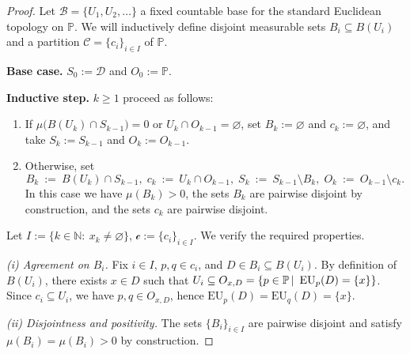 \documentclass[a4paper]{article}
\renewcommand\P{\mathbb{P}} %
\newcommand\EU{\mathrm{EU}}
\newcommand{\Decs}{\mathcal{D}}
\newcommand{\IP}{\P}
\newcommand\SetDelimiter[1][]{
	\nonscript\,#1\vert \allowbreak \nonscript\,\mathopen{}}
\providecommand\given{\SetDelimiter}
\renewcommand{\emptyset}{\varnothing}
\renewcommand{\geq}{\geqslant}
\newenvironment{CCM rewritten}
{\begingroup\color{blue}} %
{\endgroup}              %
\begin{document}
\begin{proof}
Let $\mathcal{B}=\{U_1,U_2,\dots\}$ a fixed countable base for the standard Euclidean topology on $\IP$. We will inductively define disjoint measurable sets $B_i\subseteq B(U_i)$ and a partition $\mathcal{C}=\{c_i\}_{i\in I}$ of $\IP$.

\textbf{Base case.} $S_0:=\Decs$ and $O_0:=\IP$.

\textbf{Inductive step.} $k\geq 1$ proceed as follows:

\begin{enumerate}[label=\arabic*.]
\item If $\mu\big(B(U_k)\cap S_{k-1}\big)=0$ or $U_k\cap O_{k-1}=\emptyset$, set $B_k:=\emptyset$ and $c_k:=\emptyset$, and take $S_k:=S_{k-1}$ and $O_k:=O_{k-1}$.
\item Otherwise, set
\[
B_k\ :=\ B(U_k)\cap S_{k-1},\;
c_k\ :=\ U_k\cap O_{k-1},\;
S_k\ :=\ S_{k-1}\setminus B_k,\;
O_k\ :=\ O_{k-1}\setminus c_k.
\]
In this case we have $\mu(B_k)>0$, the sets $B_k$ are pairwise disjoint by construction, and the sets $c_k$ are pairwise disjoint.
\end{enumerate}

Let $I:=\{k\in\mathbb{N}:\ x_k\neq\emptyset\}$, $\mathcal{c}:=\{c_i\}_{i\in I}$. We verify the required properties.

\smallskip

\emph{(i) Agreement on $B_i$.} Fix $i\in I$, $p,q\in c_i$, and $D\in B_i\subseteq B(U_i)$. By definition of $B(U_i)$, there exists $x\in D$ such that $U_i\subseteq O_{x,D}= \{p\in \IP\given\ \EU_p(D)=\{x\}\}$. Since $c_i\subseteq U_i$, we have $p,q\in O_{x,D}$, hence $\EU_p(D)=\EU_q(D)=\{x\}$.

\smallskip

\emph{(ii) Disjointness and positivity.} The sets $\{B_i\}_{i\in I}$ are pairwise disjoint and satisfy $\mu(B_i)=\mu(B_i)>0$ by construction.

\smallskip


\end{proof}
\end{document}
